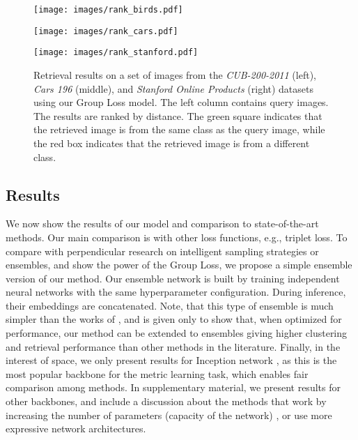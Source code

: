 \documentclass[runningheads]{llncs}
\begin{document}
\begin{figure*}[t]
\centering
\begin{minipage}{.333\textwidth}
  \flushleft \texttt{[image: images/rank\_birds.pdf]}
\end{minipage}\begin{minipage}{.333\textwidth}
  \centering
\texttt{[image: images/rank\_cars.pdf]}
\end{minipage}\begin{minipage}{.333\textwidth}
  \flushright \texttt{[image: images/rank\_stanford.pdf]}
\end{minipage}

\caption{Retrieval results on a set of images from the
\textit{CUB-200-2011} (left), \textit{Cars 196} (middle), and \textit{Stanford Online Products} (right) datasets using our Group Loss model. The left column contains query images. The results are ranked by distance. The green square indicates that the retrieved image is from the same class as the query image, while the red box indicates that the retrieved image is from a different class.}  
\label{fig:retrieval}
\end{figure*}

\subsection{Results}

We now show the results of our model and comparison to state-of-the-art methods. 
Our main comparison is with other loss functions, e.g., triplet loss. To compare with perpendicular research on intelligent sampling strategies or ensembles, and show the power of the Group Loss, we propose a simple ensemble version of our method. Our ensemble network is built by training  independent neural networks with the same hyperparameter configuration. During inference, their embeddings are concatenated. Note, that this type of ensemble is much simpler than the works of \cite{DBLP:conf/iccv/YuanYZ17,DBLP:conf/eccv/XuanSP18,DBLP:conf/eccv/KimGCLK18,DBLP:journals/corr/abs-1801-04815,DDBLP:conf/cvpr/Sanakoyeu2019}, and is given only to show that, when optimized for performance, our method can be extended to ensembles giving higher clustering and retrieval performance than other methods in the literature. 
Finally, in the interest of space, we only present results for Inception network \cite{DBLP:conf/cvpr/SzegedyLJSRAEVR15}, as this is the most popular backbone for the metric learning task, which enables fair comparison among methods. In supplementary material, we present results for other backbones, and include a discussion about the methods that work by increasing the number of parameters (capacity of the network) \cite{DBLP:journals/corr/abs-1909-05235}, or use more expressive network architectures.
\end{document}
